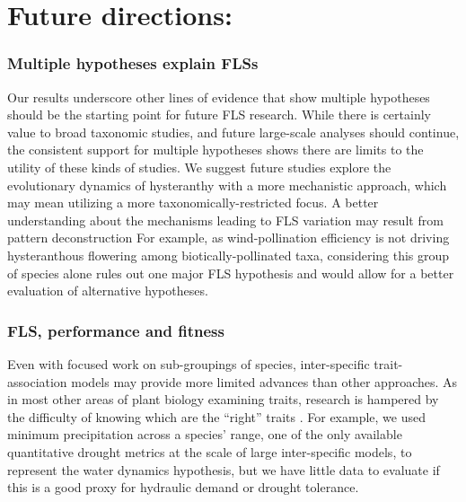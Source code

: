 \documentclass[12pt]{article}
\begin{document}
\section*{Future directions:}
\subsubsection*{Multiple hypotheses explain FLSs}
\noindent Our results underscore other lines of evidence that show multiple hypotheses should be the starting point for future FLS research. While there is certainly value to broad taxonomic studies, and future large-scale analyses should continue, the consistent support for multiple hypotheses shows there are limits to the utility of these kinds of studies. We suggest future studies explore the evolutionary dynamics of hysteranthy with a more mechanistic approach, which may mean utilizing a more taxonomically-restricted focus. A better understanding about the mechanisms leading to FLS variation may result from pattern deconstruction \citep[i.e. grouping of species according to trait commonalities or their geographic or phylogenetic distributions,][]{Terribile2009} For example, as wind-pollination efficiency is not driving hysteranthous flowering among biotically-pollinated taxa, considering this group of species alone rules out one major FLS hypothesis and would allow for a better evaluation of alternative hypotheses.

\subsubsection*{FLS, performance and fitness}
Even with focused work on sub-groupings of species, inter-specific trait-association models may provide more limited advances than other approaches. As in most other areas of plant biology examining traits, research is hampered by the difficulty of knowing which are the ``right'' traits \citep{Violle2007}. For example, we used minimum precipitation across a species' range, one of the only available quantitative drought metrics at the scale of large inter-specific models, to represent the water dynamics hypothesis, but we have little data to evaluate if this is a good proxy for hydraulic demand or drought tolerance. \\
\end{document}
